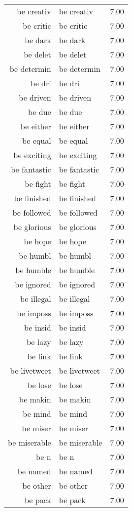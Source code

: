 \begin{table}[ht]
\begin{tabular}{rlr}
  be creativ & be creativ & 7.00 \\ 
  be critic & be critic & 7.00 \\ 
  be dark & be dark & 7.00 \\ 
  be delet & be delet & 7.00 \\ 
  be determin & be determin & 7.00 \\ 
  be dri & be dri & 7.00 \\ 
  be driven & be driven & 7.00 \\ 
  be due & be due & 7.00 \\ 
  be either & be either & 7.00 \\ 
  be equal & be equal & 7.00 \\ 
  be exciting & be exciting & 7.00 \\ 
  be fantastic & be fantastic & 7.00 \\ 
  be fight & be fight & 7.00 \\ 
  be finished & be finished & 7.00 \\ 
  be followed & be followed & 7.00 \\ 
  be glorious & be glorious & 7.00 \\ 
  be hope & be hope & 7.00 \\ 
  be humbl & be humbl & 7.00 \\ 
  be humble & be humble & 7.00 \\ 
  be ignored & be ignored & 7.00 \\ 
  be illegal & be illegal & 7.00 \\ 
  be imposs & be imposs & 7.00 \\ 
  be insid & be insid & 7.00 \\ 
  be lazy & be lazy & 7.00 \\ 
  be link & be link & 7.00 \\ 
  be livetweet & be livetweet & 7.00 \\ 
  be lose & be lose & 7.00 \\ 
  be makin & be makin & 7.00 \\ 
  be mind & be mind & 7.00 \\ 
  be miser & be miser & 7.00 \\ 
  be miserable & be miserable & 7.00 \\ 
  be n & be n & 7.00 \\ 
  be named & be named & 7.00 \\ 
  be other & be other & 7.00 \\ 
  be pack & be pack & 7.00 \\ 

\end{tabular}
\end{table}
